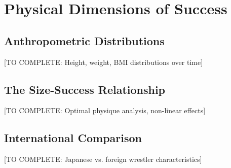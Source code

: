 \section{Physical Dimensions of Success}

\subsection{Anthropometric Distributions}

[TO COMPLETE: Height, weight, BMI distributions over time]

\subsection{The Size-Success Relationship}

[TO COMPLETE: Optimal physique analysis, non-linear effects]

\subsection{International Comparison}

[TO COMPLETE: Japanese vs. foreign wrestler characteristics]